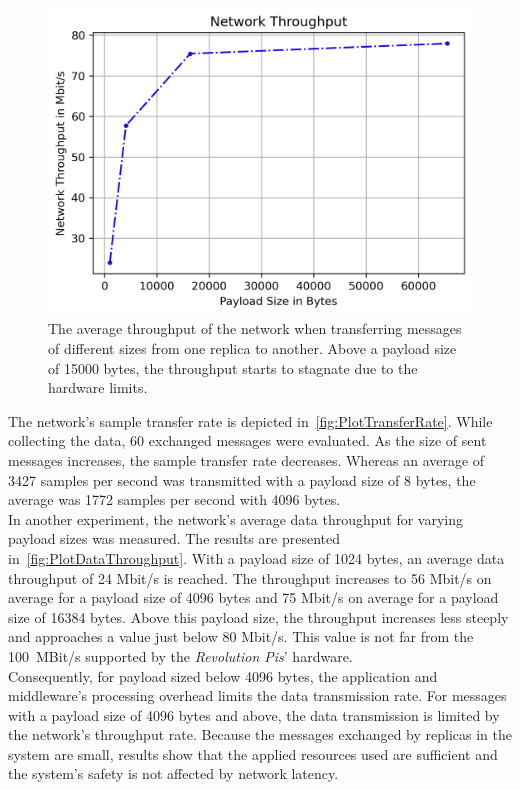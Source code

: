 \begin{figure}[!htb]
	\centering
	\includegraphics[width=0.8\linewidth]{images/plots/dataThroughput}
	\caption{The average throughput of the network when transferring messages of different sizes from one replica to another. Above a payload size of 15000 bytes, the throughput starts to stagnate due to the  hardware limits.}
	\label{fig:PlotDataThroughput}
\end{figure}

The network's sample transfer rate is depicted in~\autoref{fig:PlotTransferRate}.
While collecting the data, 60 exchanged messages were evaluated.
As the size of sent messages increases, the sample transfer rate decreases.
Whereas an average of 3427 samples per second was transmitted with a payload size of 8 bytes, the average was 1772 samples per second with 4096 bytes.
\\

In another experiment, the network's average data throughput for varying payload sizes was measured.
The results are presented in~\autoref{fig:PlotDataThroughput}.
With a payload size of 1024 bytes, an average data throughput of 24 Mbit/s is reached.
The throughput increases to 56 Mbit/s on average for a payload size of 4096 bytes and 75 Mbit/s on average for a payload size of 16384 bytes.
Above this payload size, the throughput increases less steeply and approaches a value just below 80 Mbit/s.
This value is not far from the 100~MBit/s supported by the \textit{Revolution Pis}' hardware.
\\

Consequently, for payload sized below 4096 bytes, the application and middleware's processing overhead limits the data transmission rate.
For messages with a payload size of 4096 bytes and above, the data transmission is limited by the network's throughput rate.
Because the messages exchanged by replicas in the system are small, results show that the applied resources used are sufficient and the system's safety is not affected by network latency.
\\

